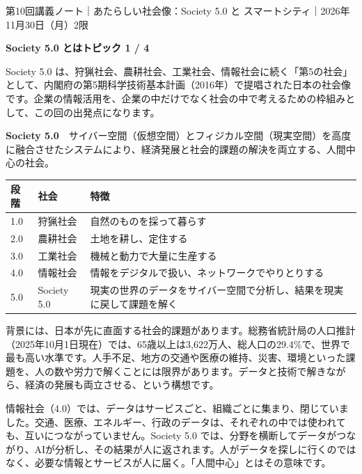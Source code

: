 \documentclass[paper=a4paper,fontsize=10pt,line_length=170mm,number_of_lines=46,baselineskip=1.6zw]{jlreq}
\newcommand\topichead[4]{%
  {\sffamily\footnotesize\color{grayt}#1\par}\vspace{1.5mm}
  {\sffamily\bfseries\LARGE #4}\hfill\colorbox{accent}{\sffamily\footnotesize\bfseries トピック #2 / #3}\par
  \vspace{1.2mm}{\color{ink}\hrule height 0.6pt}\vspace{3mm}}
\newcommand\subhead[1]{\par\vspace{2.6mm}{\sffamily\bfseries\large #1}\par\vspace{1.3mm}}
\begin{document}
\topichead{第10回講義ノート｜あたらしい社会像：Society 5.0 と スマートシティ｜2026年11月30日（月）2限}{1}{4}{Society 5.0 とは}
Society 5.0 は、狩猟社会、農耕社会、工業社会、情報社会に続く「第5の社会」として、内閣府の第5期科学技術基本計画（2016年）で提唱された日本の社会像です。企業の情報活用を、企業の中だけでなく社会の中で考えるための枠組みとして、この回の出発点になります。\par\vspace{1.2mm}
\subhead{定義}
\begin{hintbox}
{\sffamily\bfseries Society 5.0}　サイバー空間（仮想空間）とフィジカル空間（現実空間）を高度に融合させたシステムにより、経済発展と社会的課題の解決を両立する、人間中心の社会。\par
\end{hintbox}
\begin{center}\small\renewcommand{\arraystretch}{1.15}\setlength{\tabcolsep}{1.5mm}
\begin{tabular}{|p{24.0mm}|p{68.0mm}|p{68.0mm}|}\arrayrulecolor{rulec}\hline
\rowcolor{papertwo}\sffamily\bfseries 段階 & \sffamily\bfseries 社会 & \sffamily\bfseries 特徴\\\hline
1.0 & 狩猟社会 & 自然のものを採って暮らす\\\hline
2.0 & 農耕社会 & 土地を耕し、定住する\\\hline
3.0 & 工業社会 & 機械と動力で大量に生産する\\\hline
4.0 & 情報社会 & 情報をデジタルで扱い、ネットワークでやりとりする\\\hline
5.0 & Society 5.0 & 現実の世界のデータをサイバー空間で分析し、結果を現実に戻して課題を解く\\\hline
\end{tabular}\end{center}\vspace{0.5mm}
\subhead{なぜ提唱されたのか}
背景には、日本が先に直面する社会的課題があります。総務省統計局の人口推計（2025年10月1日現在）では、65歳以上は3,622万人、総人口の29.4\%で、世界で最も高い水準です。人手不足、地方の交通や医療の維持、災害、環境といった課題を、人の数や労力で解くことには限界があります。データと技術で解きながら、経済の発展も両立させる、という構想です。\par\vspace{1.2mm}
\subhead{データが「集まる」から「つながる」へ}
情報社会（4.0）では、データはサービスごと、組織ごとに集まり、閉じていました。交通、医療、エネルギー、行政のデータは、それぞれの中では使われても、互いにつながっていません。Society 5.0 では、分野を横断してデータがつながり、AIが分析し、その結果が人に返されます。人がデータを探しに行くのではなく、必要な情報とサービスが人に届く。「人間中心」とはその意味です。\par\vspace{1.2mm}
\end{document}
